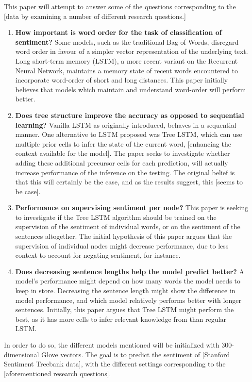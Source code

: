 This paper will attempt to answer some of the questions corresponding to the
[data by examining a number of different research questions.]
\begin{enumerate}
    \item \textbf{How important is word order for the task of classification of
    sentiment?} Some models, such as the traditional Bag of Words, disregard
    word order in favour of a simpler vector representation of the underlying
    text. Long short-term memory (LSTM), a more recent variant on the Recurrent
    Neural Network, maintains a memory state of recent words encountered to
    incorporate word-order of short and long distances. This paper initially
    believes that models which maintain and understand word-order will perform
    better. 
    \item \textbf{Does tree structure improve the accuracy as opposed to
    sequential learning?} Vanilla LSTM as originally introduced, behaves in a
    sequential manner. One alternative to LSTM proposed was Tree LSTM, which can
    use multiple prior cells to infer the state of the current word, [enhancing
    the context available for the model]. The paper seeks to investigate whether
    adding these additional precursor cells for each prediction, will actually
    increase performance of the inference on the testing. The original belief is
    that this will certainly be the case, and as the results suggest, this
    [seems to be case].
    \item \textbf{Performance on supervising sentiment per node?}
    This paper is seeking to investigate if the Tree LSTM algorithm should be
    trained on the supervision of the sentiment of individual words, or on the
    sentiment of the sentences altogether. The initial hypothesis of this paper
    argues that the supervision of individual nodes might decrease performance,
    due to less context to account for negating sentiment, for instance.
    \item \textbf{Does decreasing sentence lengths help the model predict better?}
    A model's performance might depend on how many words the model needs to keep
    in store. Decreasing the sentence length might show the difference in model
    performance, and which model relatively performs better with longer
    sentences. Initially, this paper argues that Tree LSTM might perform the
    best, as it has more cells to infer relevant knowledge from than regular
    LSTM. 

\end{enumerate}

In order to do so, the different models mentioned will be initialized with
300-dimensional Glove vectors. The goal is to predict the sentiment of [Stanford
Sentiment Treebank data], with the different settings corresponding to the [aforementioned
research questions].
